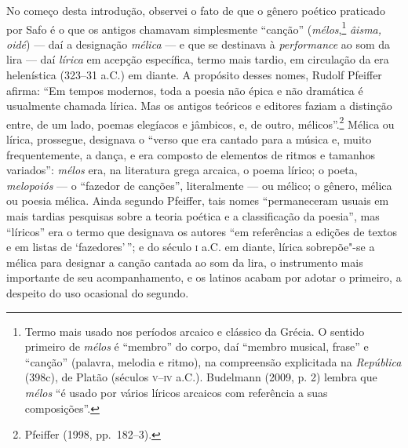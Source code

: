 
No começo desta introdução, observei o fato de que o gênero poético praticado
por Safo é o que os antigos chamavam simplesmente “canção”
(\textit{mélos},\footnote{ Termo mais usado nos períodos arcaico e clássico da
Grécia. O sentido primeiro de \textit{mélos} é “membro” do corpo, daí “membro
musical, frase” e “canção” (palavra, melodia e ritmo), na compreensão
explicitada na \textit{República} (398c), de Platão (séculos \textsc{v}--\textsc{iv} a.C.).
Budelmann (2009, p. 2) lembra que \textit{mélos} “é usado por vários líricos
arcaicos com referência a suas composições”.} \textit{âisma, oidé}) --- daí a
designação \textit{mélica} --- e que se destinava à \textit{performance} ao som
da lira --- daí \textit{lírica} em acepção específica, termo mais tardio, em
circulação da era helenística (323--31 a.C.) em diante. A propósito
desses nomes, Rudolf Pfeiffer afirma: “Em tempos
modernos, toda a poesia não épica e não dramática é usualmente chamada lírica.
Mas os antigos teóricos e editores faziam a distinção entre, de um lado, poemas
elegíacos e jâmbicos, e, de outro, mélicos”.\footnote{ Pfeiffer (1998, pp.~182--3).} Mélica ou lírica, prossegue,
designava o “verso que era cantado para a música e, muito frequentemente, a
dança, e era composto de elementos de ritmos e tamanhos variados”:
\textit{mélos} era, na literatura grega arcaica, o poema lírico; o poeta,
\textit{melopoiós} --- o “fazedor de canções”, literalmente --- ou mélico; o
gênero, mélica ou poesia mélica. Ainda segundo Pfeiffer, tais nomes
“permaneceram usuais em mais tardias pesquisas sobre a teoria poética e a
classificação da poesia”, mas “líricos” era o termo que designava os autores
“em referências a edições de textos e em listas de ‘fazedores’\,”; e do século \textsc{i}
a.C. em diante, lírica sobrepõe"-se a mélica para designar a canção
cantada ao som da lira, o instrumento mais importante de seu acompanhamento, e
os latinos acabam por adotar o primeiro, a despeito do uso ocasional do
segundo.

